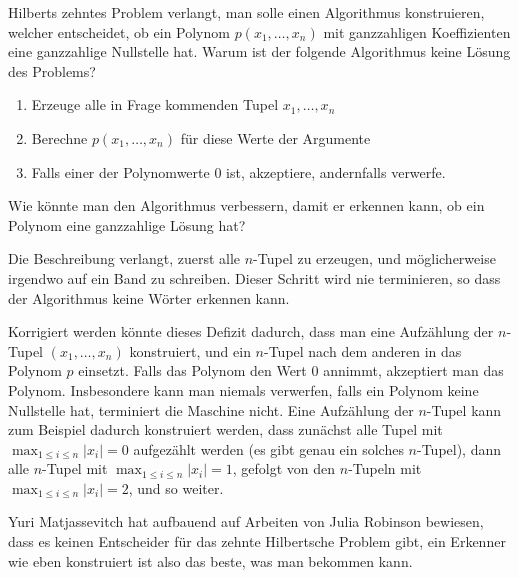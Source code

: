 Hilberts zehntes Problem verlangt, man solle einen Algorithmus
konstruieren, welcher entscheidet, ob ein Polynom $p(x_1,\dots,x_n)$
mit ganzzahligen
Koeffizienten eine ganzzahlige Nullstelle hat.
Warum ist der folgende Algorithmus keine Lösung des Problems?
\begin{enumerate}
\item Erzeuge alle in Frage kommenden Tupel $x_1,\dots,x_n$
\item Berechne $p(x_1,\dots,x_n)$ für diese Werte der Argumente
\item Falls einer der Polynomwerte $0$ ist, akzeptiere, andernfalls
verwerfe.
\end{enumerate}
Wie könnte man den Algorithmus verbessern, damit er erkennen kann,
ob ein Polynom eine ganzzahlige Lösung hat?


\begin{loesung}
Die Beschreibung verlangt, zuerst alle $n$-Tupel zu erzeugen,
und möglicherweise irgendwo auf ein Band zu schreiben. Dieser
Schritt wird nie terminieren, so dass der Algorithmus keine
Wörter erkennen kann.

Korrigiert werden könnte dieses Defizit dadurch, dass man eine
Aufzählung der $n$-Tupel $(x_1,\dots,x_n)$ konstruiert, und ein
$n$-Tupel nach dem anderen in das Polynom $p$
einsetzt. Falls das Polynom den Wert $0$ annimmt, akzeptiert man
das Polynom. Insbesondere kann man niemals verwerfen, falls
ein Polynom keine Nullstelle hat, terminiert die Maschine nicht.
Eine Aufzählung der $n$-Tupel kann zum Beispiel dadurch konstruiert
werden, dass zunächst alle Tupel mit
$\max_{1\le i\le n}|x_i|=0$
aufgezählt werden (es gibt genau ein solches $n$-Tupel),
dann alle $n$-Tupel mit
$\max_{1\le i\le n}|x_i|=1$,
gefolgt von den $n$-Tupeln mit
$\max_{1\le i\le n}|x_i|=2$, und so weiter.

Yuri Matjassevitch hat aufbauend auf Arbeiten von Julia Robinson bewiesen,
dass es
keinen Entscheider für das zehnte Hilbertsche Problem gibt,
ein Erkenner wie eben konstruiert ist also das beste, was
man bekommen kann.
\end{loesung}
